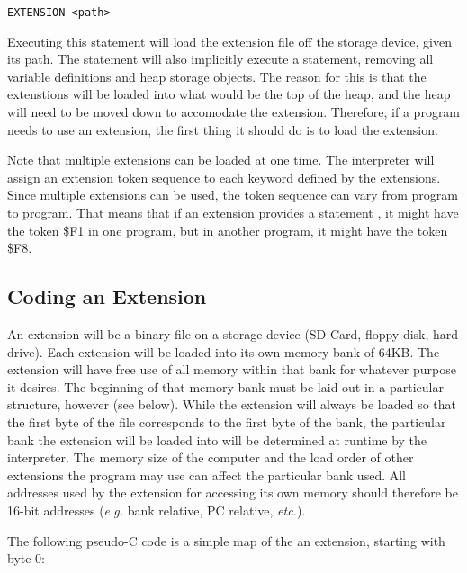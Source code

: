 \documentclass{report}
\begin{document}
    \begin{verbatim}
EXTENSION <path>        
    \end{verbatim}

    Executing this statement will load the extension file off the storage device, given its path.
    The statement will also implicitly execute a  statement, removing all variable
    definitions and heap storage objects. The reason for this is that the extenstions will be loaded
    into what would be the top of the heap, and the heap will need to be moved down to accomodate
    the extension. Therefore, if a program needs to use an extension, the first thing it should do
    is to load the extension.

    Note that multiple extensions can be loaded at one time. The interpreter will assign an extension
    token sequence to each keyword defined by the extensions. Since multiple extensions can be used,
    the token sequence can vary from program to program. That means that if an extension provides a
    statement , it might have the token \$F1 in one program, but in another program, it
    might have the token \$F8.

    \subsection*{Coding an Extension}
    
    An extension will be a binary file on a storage device (SD Card, floppy disk, hard drive). Each
    extension will be loaded into its own memory bank of 64KB. The extension will have free use of all
    memory within that bank for whatever purpose it desires. The beginning of that memory bank must be
    laid out in a particular structure, however (see below). While the extension will always be loaded so
    that the first byte of the file corresponds to the first byte of the bank, the particular bank the
    extension will be loaded into will be determined at runtime by the interpreter. The memory size of
    the computer and the load order of other extensions the program may use can affect the particular
    bank used. All addresses used by the extension for accessing its own memory should therefore be
    16-bit addresses ({\it e.g.} bank relative, PC relative, {\it etc.}).

    The following pseudo-C code is a simple map of the an extension, starting with byte 0:
\end{document}
